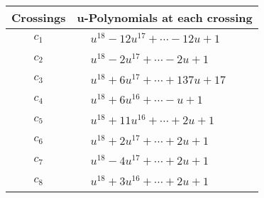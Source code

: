 \documentclass[1p]{elsarticle_modified}
\theoremstyle{definition}
\begin{document}
\begin{tabular}{m{50pt}|m{274pt}}
Crossings & \hspace{64pt}u-Polynomials at each crossing \\
\hline $$\begin{aligned}c_{1}\end{aligned}$$&$\begin{aligned}
&u^{18}-12 u^{17}+\cdots-12 u+1
\end{aligned}$\\
\hline $$\begin{aligned}c_{2}\end{aligned}$$&$\begin{aligned}
&u^{18}-2 u^{17}+\cdots-2 u+1
\end{aligned}$\\
\hline $$\begin{aligned}c_{3}\end{aligned}$$&$\begin{aligned}
&u^{18}+6 u^{17}+\cdots+137 u+17
\end{aligned}$\\
\hline $$\begin{aligned}c_{4}\end{aligned}$$&$\begin{aligned}
&u^{18}+6 u^{16}+\cdots- u+1
\end{aligned}$\\
\hline $$\begin{aligned}c_{5}\end{aligned}$$&$\begin{aligned}
&u^{18}+11 u^{16}+\cdots+2 u+1
\end{aligned}$\\
\hline $$\begin{aligned}c_{6}\end{aligned}$$&$\begin{aligned}
&u^{18}+2 u^{17}+\cdots+2 u+1
\end{aligned}$\\
\hline $$\begin{aligned}c_{7}\end{aligned}$$&$\begin{aligned}
&u^{18}-4 u^{17}+\cdots+2 u+1
\end{aligned}$\\
\hline $$\begin{aligned}c_{8}\end{aligned}$$&$\begin{aligned}
&u^{18}+3 u^{16}+\cdots+2 u+1
\end{aligned}$\\

\end{tabular}
\end{document}
